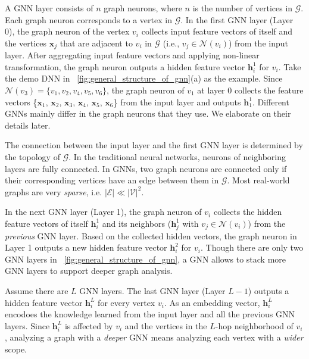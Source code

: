A GNN layer consists of $n$ graph neurons, where $n$ is the number of vertices in $\mathcal{G}$.
Each graph neuron corresponds to a vertex in $\mathcal{G}$.
In the first GNN layer (Layer 0), the graph neuron of the vertex $v_i$ collects input feature vectors of itself and the vertices $\boldsymbol{x}_j$ that are adjacent to $v_i$ in $\mathcal{G}$ (i.e., $v_j \in \mathcal{N}(v_i)$) from the input layer.
After aggregating input feature vectors and applying non-linear transformation, the graph neuron outputs a hidden feature vector $\boldsymbol{h}^1_i$ for $v_i$.
Take the demo DNN in \figurename~\ref{fig:general_structure_of_gnn}(a) as the example.
Since $\mathcal{N}(v_3) = \{v_1, v_2, v_4, v_5, v_6\}$, the graph neuron of $v_1$ at layer 0 collects the feature vectors \{$\boldsymbol{x}_1$, $\boldsymbol{x}_2$, $\boldsymbol{x}_3$, $\boldsymbol{x}_4$, $\boldsymbol{x}_5$, $\boldsymbol{x}_6$\} from the input layer and outputs $\boldsymbol{h}^1_1$.
Different GNNs mainly differ in the graph neurons that they use.
We elaborate on their details later.

The connection between the input layer and the first GNN layer is determined by the topology of $\mathcal{G}$.
In the traditional neural networks, neurons of neighboring layers are fully connected.
In GNNs, two graph neurons are connected only if their corresponding vertices have an edge between them in $\mathcal{G}$.
Most real-world graphs are very \emph{sparse}, i.e. $|\mathcal{E}| \ll |\mathcal{V}|^2$. 


In the next GNN layer (Layer 1), the graph neuron of $v_i$ collects the hidden feature vectors of itself $\boldsymbol{h}^1_i$ and its neighbors ($\boldsymbol{h}^1_j$ with $v_j \in \mathcal{N}(v_i)$) from the \emph{previous} GNN layer.
Based on the collected hidden vectors, the graph neuron in Layer 1 outputs a new hidden feature vector $\boldsymbol{h}^2_i$ for $v_i$.
Though there are only two GNN layers in \figurename~\ref{fig:general_structure_of_gnn}, a GNN allows to stack more GNN layers to support deeper graph analysis.

Assume there are $L$ GNN layers.
The last GNN layer (Layer $L-1$) outputs a hidden feature vector $\boldsymbol{h}^{L}_i$ for every vertex $v_i$.
As an embedding vector, $\boldsymbol{h}^L_i$ encodoes the knowledge learned from the input layer and all the previous GNN layers.
Since $\boldsymbol{h}^L_i$ is affected by $v_i$ and the vertices in the $L$-hop neighborhood of $v_i$, analyzing a graph with a \emph{deeper} GNN means analyzing each vertex with a \emph{wider} scope.

